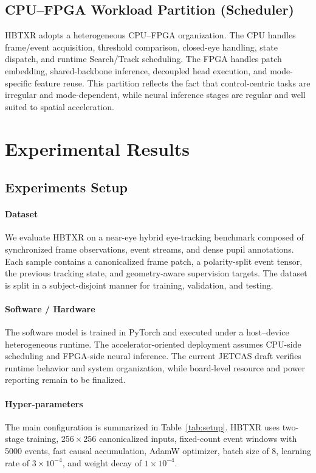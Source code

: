 \documentclass[journal]{IEEEtran}
\begin{document}
\subsection{CPU--FPGA Workload Partition (Scheduler)}
HBTXR adopts a heterogeneous CPU--FPGA organization. The CPU handles frame/event acquisition, threshold comparison, closed-eye handling, state dispatch, and runtime Search/Track scheduling. The FPGA handles patch embedding, shared-backbone inference, decoupled head execution, and mode-specific feature reuse. This partition reflects the fact that control-centric tasks are irregular and mode-dependent, while neural inference stages are regular and well suited to spatial acceleration.

\section{Experimental Results}
\subsection{Experiments Setup}
\paragraph*{Dataset}
We evaluate HBTXR on a near-eye hybrid eye-tracking benchmark composed of synchronized frame observations, event streams, and dense pupil annotations. Each sample contains a canonicalized frame patch, a polarity-split event tensor, the previous tracking state, and geometry-aware supervision targets. The dataset is split in a subject-disjoint manner for training, validation, and testing.

\paragraph*{Software / Hardware}
The software model is trained in PyTorch and executed under a host--device heterogeneous runtime. The accelerator-oriented deployment assumes CPU-side scheduling and FPGA-side neural inference. The current JETCAS draft verifies runtime behavior and system organization, while board-level resource and power reporting remain to be finalized.

\paragraph*{Hyper-parameters}
The main configuration is summarized in Table~\ref{tab:setup}. HBTXR uses two-stage training, 256\,$\times$\,256 canonicalized inputs, fixed-count event windows with 5000 events, fast causal accumulation, AdamW optimizer, batch size of 8, learning rate of $3\times10^{-4}$, and weight decay of $1\times10^{-4}$.
\end{document}
